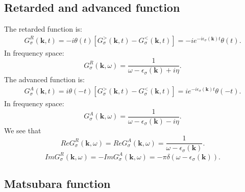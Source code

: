 \documentclass[journal=jacsat,manuscript=article]{achemso}
\begin{document}
\subsection{Retarded and advanced function}
The retarded function is:
\begin{eqnarray}
	G_{\sigma}^{R}\left(\bm{k},t\right) 
	=-i\theta\left(t\right)\left[G_{\sigma}^{>}\left(\bm{k},t\right)-G_{\sigma}^{<}\left(\bm{k},t\right)\right]
 	= -ie^{-i\epsilon_{\sigma}\left(\bm{k}\right)t}\theta\left(t\right).
\end{eqnarray}
In frequency space:
\begin{equation}
	G_{\sigma}^{R}\left(\bm{k},\omega\right)=\frac{1}{\omega-\epsilon_{\sigma}\left(\bm{k}\right)+i\eta}.
\end{equation}
The advanced function is:
\begin{eqnarray}
	G_{\sigma}^{A}\left(\bm{k},t\right) 
	= i\theta\left(-t\right)\left[G_{\sigma}^{>}\left(\bm{k},t\right)-G_{\sigma}^{<}\left(\bm{k},t\right)\right]
	= ie^{-i\epsilon_{\sigma}\left(\bm{k}\right)t}\theta\left(-t\right).
\end{eqnarray}
In frequency space:
\begin{equation}
	G_{\sigma}^{A}\left(\bm{k},\omega\right)=\frac{1}{\omega-\epsilon_{\sigma}\left(\bm{k}\right)-i\eta}.
\end{equation}
We see that
\begin{equation}
	ReG_{\sigma}^{R}\left(\bm{k},\omega\right)=ReG_{\sigma}^{A}\left(\bm{k},\omega\right)=\frac{1}{\omega-\epsilon_{\sigma}\left(\bm{k}\right)}.
\end{equation}
\begin{equation}
	ImG_{\sigma}^{R}\left(\bm{k},\omega\right)=-ImG_{\sigma}^{A}\left(\bm{k},\omega\right)=-\pi\delta\left(\omega-\epsilon_{\sigma}\left(\bm{k}\right)\right).
\end{equation}

\subsection{Matsubara function}
\end{document}
